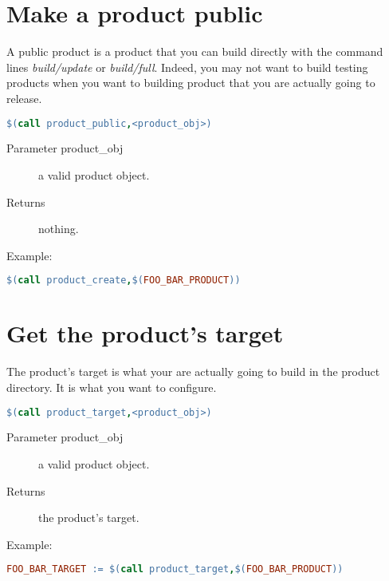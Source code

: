 \section{Make a product public}

A public product is a product that you can build directly with the command lines
\textit{build/update} or \textit{build/full}. Indeed, you may not want to build testing
products when you want to building product that you are actually going to release.

\begin{lstlisting}[language=make]
$(call product_public,<product_obj>)
\end{lstlisting}

\begin{description}
    \item[Parameter product\_obj] a valid product object.
    \item[Returns] nothing.
\end{description}

Example:
\begin{lstlisting}[language=make]
$(call product_create,$(FOO_BAR_PRODUCT))
\end{lstlisting}


\section{Get the product's target}

The product's target is what your are actually going to build in the product directory.
It is what you want to configure.

\begin{lstlisting}[language=make]
$(call product_target,<product_obj>)
\end{lstlisting}

\begin{description}
    \item[Parameter product\_obj] a valid product object.
    \item[Returns] the product's target.
\end{description}

Example:
\begin{lstlisting}[language=make]
FOO_BAR_TARGET := $(call product_target,$(FOO_BAR_PRODUCT))
\end{lstlisting}

